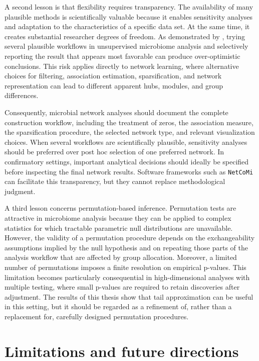 A second lesson is that flexibility requires transparency. The availability of many plausible methods is scientifically valuable because it enables sensitivity analyses and adaptation to the characteristics of a specific data set. At the same time, it creates substantial researcher degrees of freedom. As demonstrated by \citet{ullmann2023overoptimism}, trying several plausible workflows in unsupervised microbiome analysis and selectively reporting the result that appears most favorable can produce over-optimistic conclusions. This risk applies directly to network learning, where alternative choices for filtering, association estimation, sparsification, and network representation can lead to different apparent hubs, modules, and group differences.

Consequently, microbial network analyses should document the complete construction workflow, including the treatment of zeros, the association measure, the sparsification procedure, the selected network type, and relevant visualization choices. When several workflows are scientifically plausible, sensitivity analyses should be preferred over post hoc selection of one preferred network. In confirmatory settings, important analytical decisions should ideally be specified before inspecting the final network results. Software frameworks such as \texttt{NetCoMi} can facilitate this transparency, but they cannot replace methodological judgment.

A third lesson concerns permutation-based inference. Permutation tests are attractive in microbiome analysis because they can be applied to complex statistics for which tractable parametric null distributions are unavailable. However, the validity of a permutation procedure depends on the exchangeability assumptions implied by the null hypothesis and on repeating those parts of the analysis workflow that are affected by group allocation. Moreover, a limited number of permutations imposes a finite resolution on empirical p-values. This limitation becomes particularly consequential in high-dimensional analyses with multiple testing, where small p-values are required to retain discoveries after adjustment. The results of this thesis show that tail approximation can be useful in this setting, but it should be regarded as a refinement of, rather than a replacement for, carefully designed permutation procedures.

\section{Limitations and future directions}

